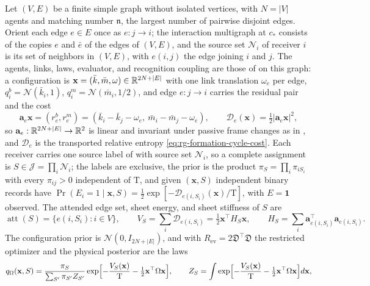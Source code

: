 Let \((V,E)\) be a finite simple graph without isolated vertices, with
\(N=|V|\) agents and matching number \(\mathfrak n\), the largest number of
pairwise disjoint edges. Orient each edge \(e\in E\) once as \(e:j\to i\); the
interaction multigraph at \(c_*\) consists of the copies \(e\) and \(\bar e\)
of the edges of \((V,E)\), and the source set \(\mathcal N_i\) of receiver \(i\)
is its set of neighbors in \((V,E)\), with \(e(i,j)\) the edge joining \(i\) and
\(j\). The agents, links, laws, evaluator, and recognition coupling are those
of  on this graph: a configuration is
\(\mathbf x=(\bar k,\bar m,\omega)\in\mathbb R^{2N+|E|}\) with one link translation
\(\omega_e\) per edge, \(q_i^b=\mathcal N(\bar k_i,1)\),
\(q_i^m=\mathcal N(\bar m_i,1/2)\), and edge \(e:j\to i\) carries the residual
pair and the cost
\begin{equation}
\mathbf a_e\mathbf x=(r^b_e,r^m_e)
=(\bar k_i-\bar k_j-\omega_e,\ \bar m_i-\bar m_j-\omega_e),
\qquad
\mathcal D_e(\mathbf x)=\tfrac12|\mathbf a_e\mathbf x|^2,
\label{eq:rg-gated-residual-pair}
\end{equation}
so \(\mathbf a_e:\mathbb R^{2N+|E|}\to\mathbb R^2\) is linear and invariant under passive
frame changes as in , and \(\mathcal D_e\) is
the transported relative entropy \cref{eq:rg-formation-cycle-cost}. Each
receiver carries one source label of 
with source set \(\mathcal N_i\), so a complete assignment is
\(S\in\mathcal J=\prod_i\mathcal N_i\); the labels are exclusive, the prior is
the product \(\pi_S=\prod_i\pi_{iS_i}\) with every \(\pi_{ij}>0\) independent
of \(\mathrm T\), and given \((\mathbf x,S)\) independent binary records have
\(\Pr(E_i=1\mid\mathbf x,S)=\tfrac12\exp[-\mathcal D_{e(i,S_i)}(\mathbf x)/\mathrm T]\),
with \(E=\mathbf 1\) observed. The attended edge set, sheet energy, and sheet
stiffness of \(S\) are
\begin{equation}
\operatorname{att}(S)=\{e(i,S_i):i\in V\},\qquad
V_S=\sum_i\mathcal D_{e(i,S_i)}=\tfrac12\mathbf x^\top H_S\mathbf x,\qquad
H_S=\sum_i\mathbf a_{e(i,S_i)}^\top\mathbf a_{e(i,S_i)}.
\label{eq:rg-gated-sheet-stiffness}
\end{equation}
The configuration prior is \(\mathcal N(0,I_{2N+|E|})\), and with
\(R_{\mathrm{ev}}=2\mathfrak D^\top\mathfrak D\) the restricted optimizer and
the physical posterior are the laws
\begin{equation}
q_\Omega(\mathbf x,S)=\frac{\pi_S}{\sum_{S'}\pi_{S'}Z_{S'}}
\exp\Bigl[-\frac{V_S(\mathbf x)}{\mathrm T}-\tfrac12\mathbf x^\top\Omega\mathbf x\Bigr],
\qquad
Z_S=\int\exp\Bigl[-\frac{V_S(\mathbf x)}{\mathrm T}-\tfrac12\mathbf x^\top\Omega\mathbf x\Bigr]d\mathbf x,
\label{eq:rg-gated-sheet-law}
\end{equation}
